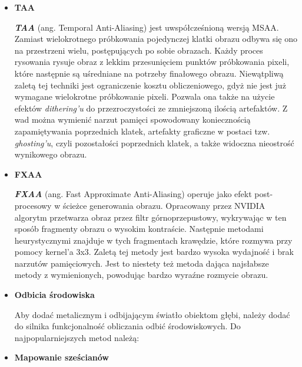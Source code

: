 \begin{itemize}
	\item \textbf{TAA}
	
	\emph{\textbf{TAA}} (ang. Temporal Anti-Aliasing) jest uwspółcześnioną wersją MSAA. Zamiast wielokrotnego próbkowania pojedynczej klatki obrazu odbywa się ono na przestrzeni wielu, postępujących po sobie obrazach. Każdy proces rysowania rysuje obraz z lekkim przesunięciem punktów próbkowania pixeli, które następnie są uśredniane na potrzeby finałowego obrazu. Niewątpliwą zaletą tej techniki jest ograniczenie kosztu obliczeniowego, gdyż nie jest już wymagane wielokrotne próbkowanie pixeli. Pozwala ona także na użycie efektów \emph{dithering'u} do przezroczystości ze zmniejszoną ilością artefaktów. Z wad można wymienić narzut pamięci spowodowany koniecznością zapamiętywania poprzednich klatek, artefakty graficzne w postaci tzw. \emph{ghosting'u}, czyli pozostałości poprzednich klatek, a także widoczna nieostrość wynikowego obrazu.
	
	\item \textbf{FXAA}
	
	\emph{\textbf{FXAA}} (ang. Fast Approximate Anti-Aliasing) operuje jako efekt post-procesowy w ścieżce generowania obrazu. Opracowany przez NVIDIA algorytm przetwarza obraz przez filtr górnoprzepustowy, wykrywając w ten sposób fragmenty obrazu o wysokim kontraście. Następnie metodami heurystycznymi znajduje w tych fragmentach krawędzie, które rozmywa przy pomocy kernel'a 3x3. Zaletą tej metody jest bardzo wysoka wydajność i brak narzutów pamięciowych. Jest to niestety też metoda dająca najsłabsze metody z wymienionych, powodując bardzo wyraźne rozmycie obrazu.
	
	\item \textbf{Odbicia środowiska}
	
	Aby dodać metalicznym i odbijającym światło obiektom głębi, należy dodać do silnika funkcjonalność obliczania odbić środowiskowych. Do najpopularniejszych metod należą:

	\item \textbf{Mapowanie sześcianów}


\end{itemize}
